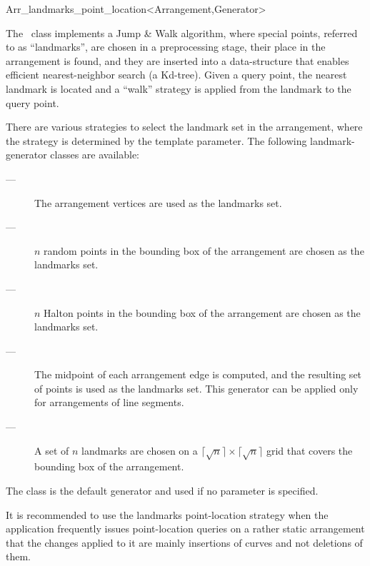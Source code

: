 
\ccRefPageBegin

\begin{ccRefClass}{Arr_landmarks_point_location<Arrangement,Generator>}
\label{arr_ref:lm_pl}

The \ccRefName\ class implements a Jump \& Walk algorithm, where special
points, referred to as ``landmarks'', are chosen in a preprocessing stage,
their place in the arrangement is found, and they are inserted into a
data-structure that enables efficient nearest-neighbor search (a
{\sc Kd}-tree). Given a query point, the nearest landmark is located and a
``walk'' strategy is applied from the landmark to the query point.

There are various strategies to select the landmark set in the
arrangement, where the strategy is determined by the
 template parameter. The following landmark-generator
classes are available:
\begin{description}
\item[ ---]
The arrangement vertices are used as the landmarks set.

\item[ ---]
$n$ random points in the bounding box of the arrangement are chosen
as the landmarks set.

\item[ ---]
$n$ Halton points in the bounding box of the arrangement are chosen
as the landmarks set.

\item[ ---]
The midpoint of each arrangement edge is computed, and the resulting
set of points is used as the landmarks set. This generator can be applied
only for arrangements of line segments.

\item[ ---]
A set of $n$ landmarks are chosen on a
$\lceil \sqrt{n} \rceil \times \lceil \sqrt{n} \rceil$
grid that covers the bounding box of the arrangement.
\end{description}
The  class is the default generator
and used if no  parameter is specified.

It is recommended to use the landmarks point-location strategy
when the application frequently issues point-location queries on a
rather static arrangement that the changes applied to it are mainly
insertions of curves and not deletions of them.


\ccIsModel
   \\

\end{ccRefClass}

\ccRefPageEnd
